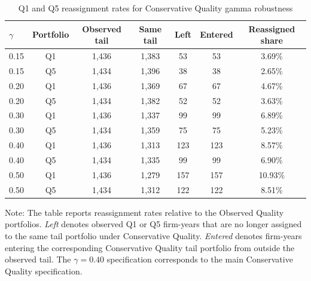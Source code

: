 \begin{table}[H]
\centering
\footnotesize
\renewcommand{\arraystretch}{1.12}
\setlength{\tabcolsep}{4pt}
\caption[Q1 and Q5 reassignment rates for Conservative Quality gamma robustness]{Q1 and Q5 reassignment rates for Conservative Quality gamma robustness}
\label{tab:conservative_gamma_reassignment}
\begin{threeparttable}
\begin{tabular*}{\textwidth}{@{\extracolsep{\fill}}lcccccc}
\toprule
$\gamma$ & Portfolio & Observed tail & Same tail & Left & Entered & Reassigned share \\
\midrule
0.15 & Q1 & 1,436 & 1,383 & 53 & 53 & 3.69\% \\
0.15 & Q5 & 1,434 & 1,396 & 38 & 38 & 2.65\% \\
0.20 & Q1 & 1,436 & 1,369 & 67 & 67 & 4.67\% \\
0.20 & Q5 & 1,434 & 1,382 & 52 & 52 & 3.63\% \\
0.30 & Q1 & 1,436 & 1,337 & 99 & 99 & 6.89\% \\
0.30 & Q5 & 1,434 & 1,359 & 75 & 75 & 5.23\% \\
0.40 & Q1 & 1,436 & 1,313 & 123 & 123 & 8.57\% \\
0.40 & Q5 & 1,434 & 1,335 & 99 & 99 & 6.90\% \\
0.50 & Q1 & 1,436 & 1,279 & 157 & 157 & 10.93\% \\
0.50 & Q5 & 1,434 & 1,312 & 122 & 122 & 8.51\% \\
\bottomrule
\end{tabular*}
\begin{tablenotes}[flushleft]
\scriptsize
\item Note: The table reports reassignment rates relative to the Observed Quality portfolios. \emph{Left} denotes observed Q1 or Q5 firm-years that are no longer assigned to the same tail portfolio under Conservative Quality. \emph{Entered} denotes firm-years entering the corresponding Conservative Quality tail portfolio from outside the observed tail. The $\gamma=0.40$ specification corresponds to the main Conservative Quality specification.
\end{tablenotes}
\end{threeparttable}
\end{table}
